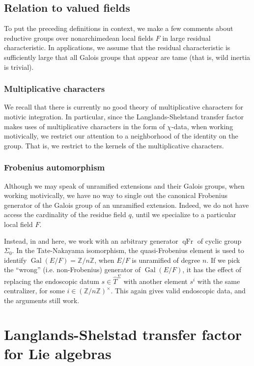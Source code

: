 \documentclass[12pt]{amsart}
\newcommand{\op}[1]{\operatorname{#1}}
\newcommand{\ring}[1]{{\mathbb #1}}
\theoremstyle{plain}
\theoremstyle{definition}
\begin{document}
\subsection{Relation to valued fields}

To put the preceding definitions in context, we make a few comments
about reductive groups over nonarchimedean local fields $F$ in large
residual characteristic.  In applications, we assume that the residual
characteristic is sufficiently large that all Galois groups that
appear are tame (that is, wild inertia is trivial).


\subsubsection{Multiplicative characters}

We recall that there is currently no good theory of multiplicative
characters for motivic integration.  In particular, since the
Langlands-Shelstand transfer factor makes uses of multiplicative
characters in the form of $\chi$-data, when working motivically,
we restrict our attention to a neighborhood of the identity on the
group.  That is, we restrict to the kernels of the multiplicative
characters.

\subsubsection{Frobenius automorphism}

Although we may speak of unramified extensions and their Galois
groups, when working motivically, we have no way to single out the
canonical Frobenius generator of the Galois group of an unramified
extension.  Indeed, we do not have access the cardinality of the
residue field $q$, until we specialize to a particular local field
$F$.

Instead, in \cite{CHL} and here, we work with an arbitrary generator
$\op{qFr}$ of cyclic group $\Sigma_0$.  In the Tate-Nakayama
isomorphism, the quasi-Frobenius element is used to identify
$\op{Gal}(E/F) = \ring{Z}/n\ring{Z}$, when $E/F$ is unramified of
degree $n$.  If we pick the ``wrong'' (i.e. non-Frobenius) generator
of $\op{Gal}(E/F)$, it has the effect of replacing the endoscopic
datum $s\in \hat T^\Sigma$ with another element $s^i$ with the same
centralizer, for some $i\in (\ring{Z}/n\ring{Z})^\times$.  This again
gives valid endoscopic data, and the arguments still work.


\section{Langlands-Shelstad transfer factor for Lie algebras}\label{sec:lsxfer}
\end{document}
